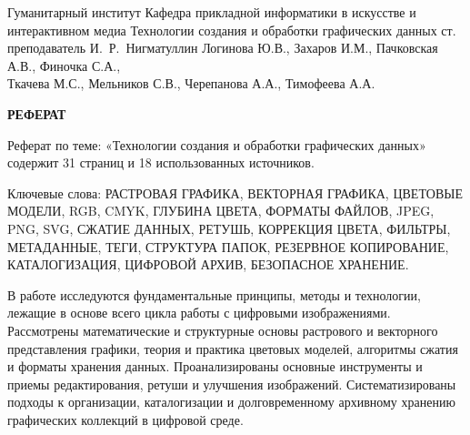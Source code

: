 \documentclass{SibFU-docs}
\begin{document}
\renewcommand{\contentsname}{}
\mycovertitle
{Гуманитарный институт}
{Кафедра прикладной информатики в искусстве и интерактивном медиа}
{Технологии создания и обработки графических данных}
{ст. преподаватель И.~Р.~Нигматуллин}
{Логинова Ю.В., Захаров И.М., Пачковская А.В., Финочка С.А., \\Ткачева М.С., Мельников С.В., Черепанова А.А., Тимофеева А.А.}
 
\begin{center}
\bfseries РЕФЕРАТ
\end{center}
\noindent

Реферат по теме: «Технологии создания и обработки графических данных» содержит 31 страниц и 18 использованных источников.

Ключевые слова: РАСТРОВАЯ ГРАФИКА, ВЕКТОРНАЯ ГРАФИКА, ЦВЕТОВЫЕ МОДЕЛИ, RGB, CMYK, ГЛУБИНА ЦВЕТА, ФОРМАТЫ ФАЙЛОВ, JPEG, PNG, SVG, СЖАТИЕ ДАННЫХ, РЕТУШЬ, КОРРЕКЦИЯ ЦВЕТА, ФИЛЬТРЫ, МЕТАДАННЫЕ, ТЕГИ, СТРУКТУРА ПАПОК, РЕЗЕРВНОЕ КОПИРОВАНИЕ, КАТАЛОГИЗАЦИЯ, ЦИФРОВОЙ АРХИВ, БЕЗОПАСНОЕ ХРАНЕНИЕ.

В работе исследуются фундаментальные принципы, методы и технологии, лежащие в основе всего цикла работы с цифровыми изображениями. Рассмотрены математические и структурные основы растрового и векторного представления графики, теория и практика цветовых моделей, алгоритмы сжатия и форматы хранения данных. Проанализированы основные инструменты и приемы редактирования, ретуши и улучшения изображений. Систематизированы подходы к организации, каталогизации и долговременному архивному хранению графических коллекций в цифровой среде.
\end{document}
